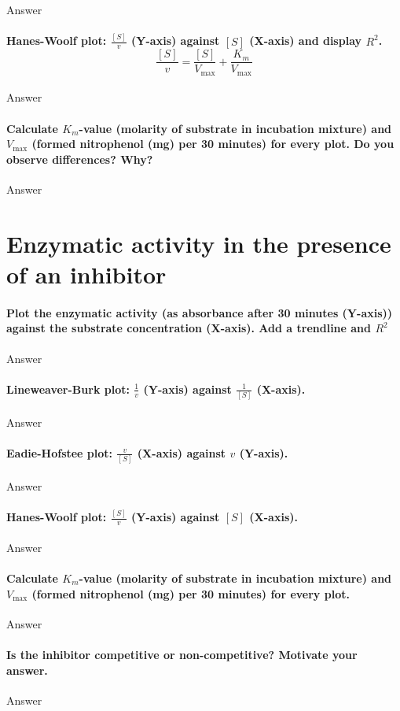\documentclass[a4paper,12pt]{article}
\begin{document}
Answer\\

\paragraph{Hanes-Woolf plot: $\frac{[S]}{v}$ (Y-axis) against $[S]$ (X-axis) and display $R^2$. \[\frac{[S]}{v}=\frac{[S]}{V_{\text{max}}}+\frac{K_m}{V_{\text{max}}}\]}

Answer\\

\paragraph{Calculate $K_m$-value (molarity of substrate in incubation mixture) and $V_{\text{max}}$ (formed nitrophenol (mg) per 30 minutes) for every plot. Do you observe 
differences? Why? 
}

Answer\\

\section{Enzymatic activity in the presence of an inhibitor}

\paragraph{Plot the enzymatic activity (as absorbance after 30 minutes (Y-axis)) 
against the substrate concentration (X-axis). Add a trendline and $R^2$}

Answer\\

\paragraph{Lineweaver-Burk plot: $\frac{1}{v}$ (Y-axis) against $\frac{1}{[S]}$ (X-axis).}

Answer\\

\paragraph{Eadie-Hofstee plot: $\frac{v}{[S]}$ (X-axis) against $v$ (Y-axis).}

Answer\\

\paragraph{Hanes-Woolf plot: $\frac{[S]}{v}$ (Y-axis) against $[S]$ (X-axis).}

Answer\\

\paragraph{Calculate $K_m$-value (molarity of substrate in incubation mixture) and $V_{\text{max}}$ (formed nitrophenol (mg) per 30 minutes) for every plot.}
 
 Answer\\

\paragraph{Is the inhibitor competitive or non-competitive? Motivate your answer.}

Answer\\
\end{document}
